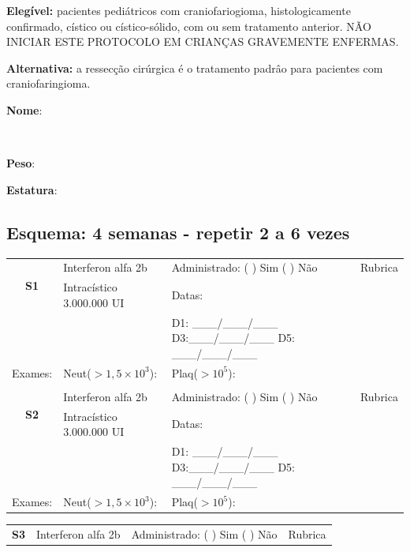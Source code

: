 \documentclass[11pt,a4paper,oldfontcommands]{memoir}
\def\entrywithlabel[#1]#2{\parbox{#1}{{\small #2:} \hrulefill}}
\begin{document}
\textbf{Elegível:} pacientes pediátricos com craniofariogioma, histologicamente confirmado, cístico ou cístico-sólido, com ou sem tratamento anterior. NÃO INICIAR ESTE PROTOCOLO EM CRIANÇAS GRAVEMENTE ENFERMAS.

\textbf{Alternativa:} a ressecção cirúrgica é o tratamento padrâo para pacientes com craniofaringioma.
\\[0.4cm]
\entrywithlabel[1\hsize]{\textbf{Nome}}\hfill
\\[0.3cm]
\entrywithlabel[.45\hsize]{\textbf{Peso}}\hfill  \entrywithlabel[.45\hsize]{\textbf{Estatura}}

\subsection{Esquema: 4 semanas - repetir 2 a 6 vezes}
\begin{center}
\begin{table}[H]
\begin{tabular}{p{1.3cm}p{4.2cm}|p{8cm}|p{}}
    \hline
    \multicolumn{1}{c|}{\multirow{2}{*}{\textbf{S1}}}&{Interferon alfa 2b}&{Administrado: (  ) Sim (  ) Não}&{Rubrica}\\
    \multicolumn{1}{c|}{}&{Intracístico 3.000.000 UI}&{Datas:}&\\
    \multicolumn{1}{c|}{}&{}&{D1: \_\_\_/\_\_\_/\_\_\_ D3:\_\_\_/\_\_\_/\_\_\_ D5: \_\_\_/\_\_\_/\_\_\_}&\\
    \hline
    {Exames:}&{Neut(\(>1,5\times10^3\)):}&{Plaq(\(>10^5\)):}&{}
    \\
    \hline
    \\
    \hline
    \multicolumn{1}{c|}{\multirow{2}{*}{\textbf{S2}}}&{Interferon alfa 2b}&{Administrado: (  ) Sim (  ) Não}&{Rubrica}\\
    \multicolumn{1}{c|}{}&{Intracístico 3.000.000 UI}&{Datas:}&\\
    \multicolumn{1}{c|}{}&{}&{D1: \_\_\_/\_\_\_/\_\_\_ D3:\_\_\_/\_\_\_/\_\_\_ D5: \_\_\_/\_\_\_/\_\_\_}&\\
    \hline
    {Exames:}&{Neut(\(>1,5\times10^3\)):}&{Plaq(\(>10^5\)):}&{}
    \\
    \hline
\end{tabular}
\end{table}
\begin{table}[H]
\begin{tabular}{p{1.3cm}p{4.2cm}|p{8cm}|p{}}
    \hline
    \multicolumn{1}{c|}{\multirow{2}{*}{\textbf{S3}}}&{Interferon alfa 2b}&{Administrado: (  ) Sim (  ) Não}&{Rubrica}\\

\end{tabular}
\end{table}
\end{center}
\end{document}
